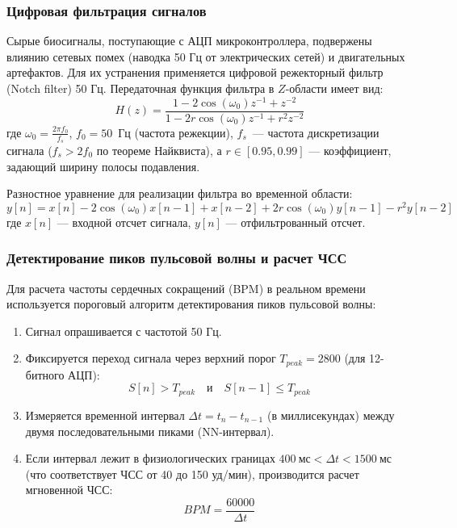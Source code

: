 \documentclass[utf8, russian]{eskdtext}
\begin{document}
\subsubsection{Цифровая фильтрация сигналов}
Сырые биосигналы, поступающие с АЦП микроконтроллера, подвержены влиянию сетевых помех (наводка 50 Гц от электрических сетей) и двигательных артефактов. Для их устранения применяется цифровой режекторный фильтр (Notch filter) 50 Гц. Передаточная функция фильтра в $Z$-области имеет вид:
\begin{equation}
    H(z) = \frac{1 - 2\cos(\omega_0)z^{-1} + z^{-2}}{1 - 2r\cos(\omega_0)z^{-1} + r^2 z^{-2}}
\end{equation}
где $\omega_0 = \frac{2\pi f_0}{f_s}$, $f_0 = 50$~Гц (частота режекции), $f_s$~--- частота дискретизации сигнала ($f_s > 2f_0$ по теореме Найквиста), а $r \in [0.95, 0.99]$ — коэффициент, задающий ширину полосы подавления.

Разностное уравнение для реализации фильтра во временной области:
\begin{equation}
    y[n] = x[n] - 2\cos(\omega_0)x[n-1] + x[n-2] + 2r\cos(\omega_0)y[n-1] - r^2 y[n-2]
\end{equation}
где $x[n]$ — входной отсчет сигнала, $y[n]$ — отфильтрованный отсчет.

\subsubsection{Детектирование пиков пульсовой волны и расчет ЧСС}
Для расчета частоты сердечных сокращений (BPM) в реальном времени используется пороговый алгоритм детектирования пиков пульсовой волны:
\begin{enumerate}
    \item Сигнал опрашивается с частотой 50 Гц.
    \item Фиксируется переход сигнала через верхний порог $T_{peak} = 2800$ (для 12-битного АЦП):
          \begin{equation}
              S[n] > T_{peak} \quad \text{и} \quad S[n-1] \le T_{peak}
          \end{equation}
    \item Измеряется временной интервал $\Delta t = t_n - t_{n-1}$ (в миллисекундах) между двумя последовательными пиками (NN-интервал).
    \item Если интервал лежит в физиологических границах $400~\text{мс} < \Delta t < 1500~\text{мс}$ (что соответствует ЧСС от 40 до 150 уд/мин), производится расчет мгновенной ЧСС:
          \begin{equation}
              BPM = \frac{60000}{\Delta t}
          \end{equation}
\end{enumerate}
\end{document}
